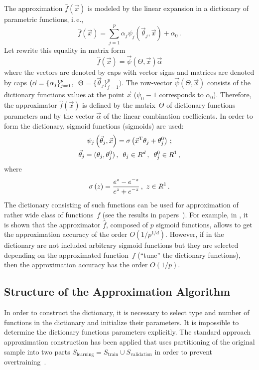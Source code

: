 \begin{multicols}{2}
\noindent
The approximation $\hat f\left( {\vec x} \right)$ is modeled
by the linear expansion in a 
dictionary of parametric functions, i.\,e.,
$$ 
\hat f\left({\vec x}\right) = \sum\limits_{j = 1}^p \alpha_j 
\psi_j\left( {\vec \theta_j},  {\vec x} \right) + \alpha_0\,.
$$
Let rewrite this equality in matrix form
$$
\hat f \left( {\vec x} \right) = {\vec \psi} \left( {\Theta}, {\vec x} \right) {\vec \alpha}
$$ 
where the vectors are denoted by caps with vector signs and matrices are denoted by caps 
$({\vec \alpha} = \{ \alpha_j \}_{j = 0}^p\,,\enskip \Theta$\linebreak $ = \{ \vec \theta_j \}_{j = 1}^p)$.
The row-vector ${\vec \psi} \left( {\Theta}, {\vec x} \right)$ consists of the dictionary functions 
values at the point ${\vec x}$ ($\psi_0 \equiv 1$ corresponds to $\alpha_0$).
Therefore, the approximator $\hat f \left( {\vec x}\right)$ is defined by the 
matrix~$\Theta$ of dictionary functions parameters and by the vector
  ${\vec \alpha}$ of the linear combination coefficients.
In order to form the dictionary, sigmoid functions (sigmoids) are used:
\begin{gather*}
  \psi_j\left( {\vec \theta_j}, {\vec x} \right) =
        \sigma\left({\vec x}^{\mathrm{T}}\theta_j + \theta_j^0\right)\,;\\
        {\vec\theta}_j = (\theta_j,\theta_j^0)\,,\enskip 
        \theta_j \in R^d\,, \enskip 
        \theta_j^0\in R^1\,,
        \end{gather*}
        where
        $$
     \sigma\left(z\right) = \displaystyle\frac{\displaystyle e^z - e^{-z}\mathstrut}{\displaystyle e^z + e^{-z}\mathstrut}\,,\ z\in R^1\,.
$$
The dictionary consisting of such functions can be used for approximation of rather wide class 
of  functions~$f$ (see the results in papers~\cite{petrushev, sigmoidApprox1}).
For example, in \cite{sigmoidApprox1}, it is shown that the approximator
 $\hat f$, composed of $p$ sigmoid functions, allows to get the approximation 
 accuracy of the order $O \left( 1/p^{{1}/{d}}\right)$. 
However, if in the dictionary 
are  not included arbitrary sigmoid functions but  they are selected
depending on the approximated function~$f$ 
  (``tune'' the dictionary functions),
then the approximation accuracy has the order $O\left(1/p\right)$.

\subsection{Structure of the Approximation Algorithm}
\label{approxAlgo}

\noindent
In order to construct the dictionary, it is necessary to select type and  
number of functions in the dictionary and initialize their parameters.
It is impossible to determine the dictionary functions parameters explicitly.
The standard approach approximation construction has been applied that uses partitioning 
of the original sample into two parts $S_{\mathrm{learning}} = 
S_{\mathrm{train}} \cup S_{\mathrm{validation}}$ 
in order to prevent overtraining~\cite{vapnik}.


\end{multicols}
